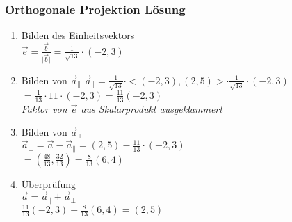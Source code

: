 \begin{frame}
    \frametitle{Orthogonale Projektion Lösung}
    \begin{enumerate}
        \item Bilden des Einheitsvektors \\
        $\vec{e} = \frac{\vec{b}}{\lvert \vec{b} \rvert} = \frac{1}{\sqrt{13}} \cdot (-2, 3)$\\
        \item Bilden von $\vec{a}_{\parallel}$
        $\vec{a}_{\parallel} = \frac{1}{\sqrt{13}} \cdot <(-2, 3), (2, 5)> \cdot \frac{1}{\sqrt{13}} \cdot (-2, 3)$ \\
        $= \frac{1}{13} \cdot 11 \cdot (-2, 3) = \frac{11}{13}(-2, 3)$\\
        \textit{Faktor von $\vec{e}$  aus Skalarprodukt ausgeklammert}\\
        \item Bilden von $\vec{a}_{\perp}$ \\
        $\vec{a}_{\perp} = \vec{a} - \vec{a}_{\parallel} = (2, 5) - \frac{11}{13} \cdot (-2, 3)$\\
        $= (\frac{48}{13}, \frac{32}{13}) = \frac{8}{13}(6, 4)$\\
        \item Überprüfung \\
        $\vec{a} = \vec{a}_{\parallel} + \vec{a}_{\perp}$\\
        $\frac{11}{13}(-2, 3) + \frac{8}{13}(6, 4) = (2, 5)$ \\
    \end{enumerate}
\end{frame}
